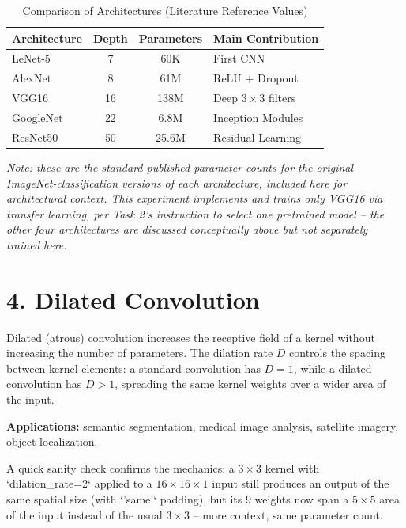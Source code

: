 \documentclass[11pt]{article}
\begin{document}
\begin{table}[H]
\centering
\caption{Comparison of Architectures (Literature Reference Values)}
\begin{tabular}{lccp{4.5cm}}
\toprule
Architecture & Depth & Parameters & Main Contribution \\
\midrule
LeNet-5 & 7 & 60K & First CNN \\
AlexNet & 8 & 61M & ReLU + Dropout \\
VGG16 & 16 & 138M & Deep $3\times3$ filters \\
GoogleNet & 22 & 6.8M & Inception Modules \\
ResNet50 & 50 & 25.6M & Residual Learning \\
\bottomrule
\end{tabular}
\end{table}

\textit{Note: these are the standard published parameter counts for the original ImageNet-classification versions of each architecture, included here for architectural context. This experiment implements and trains only VGG16 via transfer learning, per Task 2's instruction to select one pretrained model -- the other four architectures are discussed conceptually above but not separately trained here.}


\section*{4. Dilated Convolution}

Dilated (atrous) convolution increases the receptive field of a kernel without increasing the number of parameters. The dilation rate $D$ controls the spacing between kernel elements: a standard convolution has $D=1$, while a dilated convolution has $D>1$, spreading the same kernel weights over a wider area of the input.

\textbf{Applications:} semantic segmentation, medical image analysis, satellite imagery, object localization.

A quick sanity check confirms the mechanics: a $3\times3$ kernel with `dilation\_rate=2` applied to a $16\times16\times1$ input still produces an output of the same spatial size (with `'same'` padding), but its 9 weights now span a $5\times5$ area of the input instead of the usual $3\times3$ -- more context, same parameter count.

\end{document}
